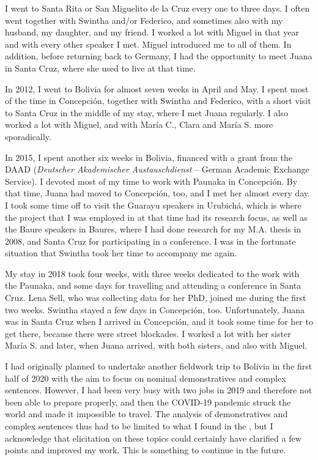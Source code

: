 I went to Santa Rita or San Miguelito de la Cruz every one to three days. I often went together with Swintha and/or Federico, and sometimes also with my husband, my daughter, and my friend. I worked a lot with Miguel in that year and with every other speaker I met. Miguel introduced me to all of them. 
In addition, before returning back to Germany, I had the opportunity to meet Juana in Santa Cruz, where she used to live at that time.

In 2012, I went to Bolivia for almost seven weeks in April and May. I spent most of the time in Concepción, together with Swintha and Federico, with a short visit to Santa Cruz in the middle of my stay, where I met Juana regularly. I also worked a lot with Miguel, and with María C., Clara and María S. more sporadically.

In 2015, I spent another six weeks in Bolivia, financed with a grant from the DAAD (\textit{Deutscher Akademischer Austauschdienst} – German Academic Exchange Service). I devoted most of my time to work with Paunaka in Concepción. By that time, Juana had moved to Concepción, too, and I met her almost every day. I took some time off to visit the Guarayu speakers in Urubichá, which is where the project that I was employed in at that time had its research focus, as well as the Baure speakers in Baures, where I had done research for my M.A. thesis in 2008, and Santa Cruz for participating in a conference. I was in the fortunate situation that Swintha took her time to accompany me again.

My stay in 2018 took four weeks, with three weeks dedicated to the work with the Paunaka, and some days for travelling and attending a conference in Santa Cruz. Lena Sell, who was collecting data for her PhD, joined me during the first two weeks. Swintha stayed a few days in Concepción, too. Unfortunately, Juana was in Santa Cruz when I arrived in Concepción, and it took some time for her to get there, because there were street blockades. I worked a lot with her sister María S. and later, when Juana arrived, with both sisters, and also with Miguel.

I had originally planned to undertake another fieldwork trip to Bolivia in the first half of 2020 with the aim to focus on nominal demonstratives and complex sentences. However, I had been very busy with two jobs in 2019 and therefore not been able to prepare properly, and then the COVID-19 pandemic struck the world and made it impossible to travel. The analysis of demonstratives and complex sentences thus had to be limited to what I found in the , but I acknowledge that elicitation on these topics could certainly have clarified a few points and improved my work. This is something to continue in the future. 

